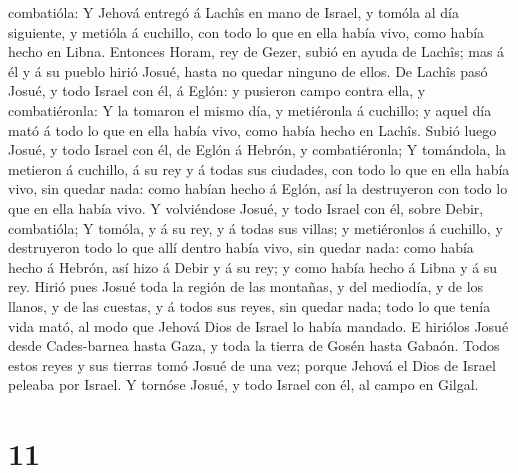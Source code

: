 combatióla:  Y Jehová entregó á Lachîs en mano de Israel, y
tomóla al día siguiente, y metióla á cuchillo, con todo lo que en ella
había vivo, como había hecho en Libna.  Entonces Horam, rey
de Gezer, subió en ayuda de Lachîs; mas á él y á su pueblo hirió Josué,
hasta no quedar ninguno de ellos.  De Lachîs pasó Josué, y
todo Israel con él, á Eglón: y pusieron campo contra ella, y
combatiéronla:  Y la tomaron el mismo día, y metiéronla á
cuchillo; y aquel día mató á todo lo que en ella había vivo, como había
hecho en Lachîs.  Subió luego Josué, y todo Israel con él,
de Eglón á Hebrón, y combatiéronla;  Y tomándola, la
metieron á cuchillo, á su rey y á todas sus ciudades, con todo lo que en
ella había vivo, sin quedar nada: como habían hecho á Eglón, así la
destruyeron con todo lo que en ella había vivo.  Y
volviéndose Josué, y todo Israel con él, sobre Debir, combatióla;
 Y tomóla, y á su rey, y á todas sus villas; y metiéronlos
á cuchillo, y destruyeron todo lo que allí dentro había vivo, sin quedar
nada: como había hecho á Hebrón, así hizo á Debir y á su rey; y como
había hecho á Libna y á su rey.  Hirió pues Josué toda la
región de las montañas, y del mediodía, y de los llanos, y de las
cuestas, y á todos sus reyes, sin quedar nada; todo lo que tenía vida
mató, al modo que Jehová Dios de Israel lo había mandado. 
E hiriólos Josué desde Cades-barnea hasta Gaza, y toda la tierra de
Gosén hasta Gabaón.  Todos estos reyes y sus tierras tomó
Josué de una vez; porque Jehová el Dios de Israel peleaba por Israel.
 Y tornóse Josué, y todo Israel con él, al campo en Gilgal.

\hypertarget{section-10}{%
\section{11}\label{section-10}}

